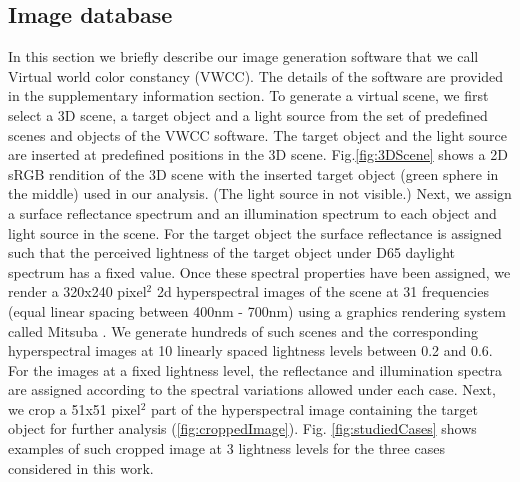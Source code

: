 \documentclass{jov}
\begin{document}
\subsection{Image database} \label{method:VirtualWorld}
In this section we briefly describe our image generation software that we call Virtual world color constancy (VWCC). The details of the software are provided in the supplementary information section. To generate a virtual scene, we first select a 3D scene, a target object and a light source from the set of predefined scenes and objects of the VWCC software. The target object and the light source are inserted at predefined positions in the 3D scene. Fig.\ref{fig:3DScene} shows a 2D sRGB rendition of the 3D scene with the inserted target object (green sphere in the middle) used in our analysis. (The light source in not visible.) Next, we assign a surface reflectance spectrum and an illumination spectrum to each object and light source in the scene. For the target object the surface reflectance is assigned such that the perceived lightness of the target object under D65 daylight spectrum has a fixed value. Once these spectral properties have been assigned, we render a 320x240 pixel$^2$ 2d hyperspectral images of the scene at 31 frequencies (equal linear spacing between 400nm - 700nm) using a graphics rendering system called Mitsuba \cite{jakob2015mitsuba}. We generate hundreds of such scenes and the corresponding hyperspectral images at 10 linearly spaced lightness levels between 0.2 and 0.6. For the images at a fixed lightness level, the reflectance and illumination spectra are assigned according to the spectral variations allowed under each case. Next, we crop a 51x51 pixel$^2$ part of the hyperspectral image containing the target object for further analysis (\ref{fig:croppedImage}). Fig. \ref{fig:studiedCases} shows examples of such cropped image at 3 lightness levels for the three cases considered in this work.
\end{document}
